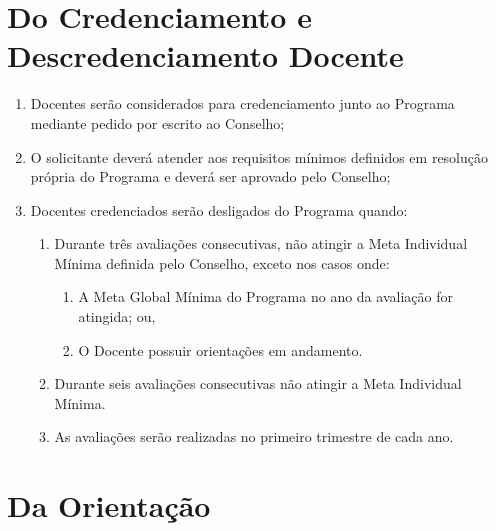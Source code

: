\documentclass{article}
\newcommand{\grupoMaior}{Conselho\xspace}
\begin{document}
\section{Do Credenciamento e Descredenciamento Docente}
\label{credenciamento}
\begin{enumerate}
	\item Docentes serão considerados para credenciamento junto ao Programa mediante pedido por escrito ao \grupoMaior;

	\item O solicitante deverá atender aos requisitos mínimos definidos em resolução própria do Programa e deverá ser aprovado pelo \grupoMaior;

	\item Docentes credenciados serão desligados do Programa quando:
	\begin{enumerate}
		\item Durante três avaliações consecutivas, não atingir a Meta Individual Mínima definida pelo \grupoMaior, exceto nos casos onde:
		\begin{enumerate}
			\item A Meta Global Mínima do Programa no ano da avaliação for atingida; ou,
			\item O Docente possuir orientações em andamento.
		\end{enumerate}

		\item Durante seis avaliações consecutivas não atingir a Meta Individual Mínima.

		\item As avaliações serão realizadas no primeiro trimestre de cada ano.
	\end{enumerate}

\end{enumerate}


\section{Da Orientação}
\end{document}
